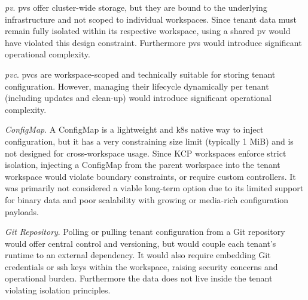 \documentclass[11pt, a4paper, oneside, listof=totoc]{scrartcl}
\begin{document}
                \begin{enumerate}[label={[\arabic*]:},
                    ref=Challenge~\arabic*,
                    leftmargin=*,
                    itemsep=0.6\baselineskip]

                    \item\label{chal:pv}
                        \textit{\gls{pv}}.
                        \glspl{pv} offer cluster-wide storage, but they are bound to the
                        underlying infrastructure and not scoped to individual workspaces.
                        Since tenant data must remain fully isolated within its respective
                        workspace, using a shared \gls{pv} would have violated this design
                        constraint.
                        Furthermore \glspl{pv} would introduce significant operational complexity.
                        
                    \item\label{chal:pvc}
                        \textit{\gls{pvc}}.
                        \glspl{pvc} are workspace-scoped and technically suitable for storing tenant
                        configuration.
                        However, managing their lifecycle dynamically per tenant (including updates
                        and clean-up) would introduce significant operational complexity.

                    \item\label{chal:configMap}
                        \textit{ConfigMap}.
                        A ConfigMap is a lightweight and \gls{k8s} native way to inject
                        configuration, but it has a very constraining size limit (typically 1 MiB)
                        and is not designed for cross-workspace usage.  
                        Since KCP workspaces enforce strict isolation, injecting a ConfigMap from
                        the parent workspace into the tenant workspace would violate boundary
                        constraints, or require custom controllers.  
                        It was primarily not considered a viable long-term option due to its limited
                        support for binary data and poor scalability with growing or media-rich
                        configuration payloads.

                    \item\label{chal:gitRepo}
                        \textit{Git Repository}.
                        Polling or pulling tenant configuration from a Git repository would offer
                        central control and versioning, but would couple each tenant's runtime to an
                        external dependency.
                        It would also require embedding Git credentials or \gls{ssh} keys within the
                        workspace, raising security concerns and operational burden.
                        Furthermore the data does not live inside the tenant violating isolation
                        principles.


\end{enumerate}
\end{document}
